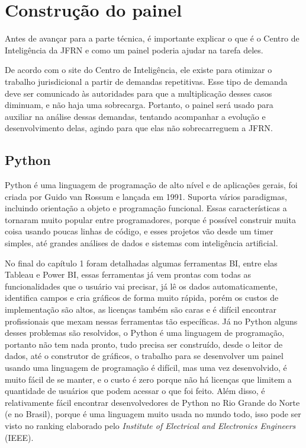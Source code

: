 \chapter{Construção do painel}\label{cap_trabalho_academico}

Antes de avançar para a parte técnica, é importante explicar o que é o Centro de Inteligência da JFRN e como um painel poderia ajudar na tarefa deles.

De acordo com o site do Centro de Inteligência, ele existe para otimizar o trabalho jurisdicional a partir de demandas repetitivas. Esse tipo de demanda deve ser comunicado às autoridades para que a multiplicação desses casos diminuam, e não haja uma sobrecarga. Portanto, o painel será usado para auxiliar na análise dessas demandas, tentando acompanhar a evolução e desenvolvimento delas, agindo para que elas não sobrecarreguem a JFRN.


\section{Python}

Python é uma linguagem de programação de alto nível e de aplicações gerais, foi criada por Guido van Rossum e lançada em 1991. Suporta vários paradigmas, incluindo orientação a objeto e programação funcional. Essas características a tornaram muito popular entre programadores, porque é possível construir muita coisa usando poucas linhas de código, e esses projetos vão desde um timer simples, até grandes análises de dados e sistemas com inteligência artificial.

No final do capítulo 1 foram detalhadas algumas ferramentas BI, entre elas Tableau e Power BI, essas ferramentas já vem prontas com todas as funcionalidades que o usuário vai precisar, já lê os dados automaticamente, identifica campos e cria gráficos de forma muito rápida, porém os custos de implementação são altos, as licenças também são caras e é difícil encontrar profissionais que mexam nessas ferramentas tão específicas. Já no Python alguns desses problemas são resolvidos, o Python é uma linguagem de programação, portanto não tem nada pronto, tudo precisa ser construído, desde o leitor de dados, até o construtor de gráficos, o trabalho para se desenvolver um painel usando uma linguagem de programação é difícil, mas uma vez desenvolvido, é muito fácil de se manter, e o custo é zero porque não há licenças que limitem a quantidade de usuários que podem acessar o que foi feito. Além disso, é relativamente fácil encontrar desenvolvedores de Python no Rio Grande do Norte (e no Brasil), porque é uma linguagem muito usada no mundo todo, isso pode ser visto no ranking elaborado pelo \textit{Institute of Electrical and Electronics Engineers} (IEEE).

